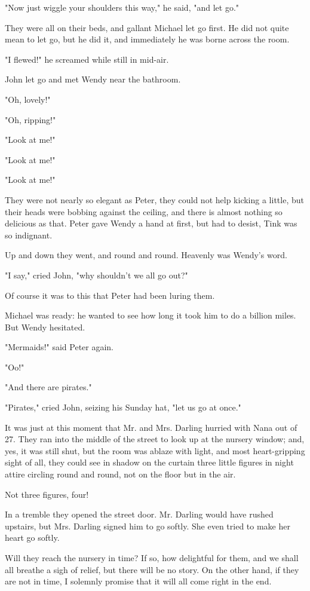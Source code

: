 "Now just wiggle your shoulders this way," he said, "and let go."


They were all on their beds, and gallant Michael let go first. He did not
quite mean to let go, but he did it, and immediately he was borne across
the room.


"I flewed!" he screamed while still in mid-air.


John let go and met Wendy near the bathroom.


"Oh, lovely!"


"Oh, ripping!"


"Look at me!"


"Look at me!"


"Look at me!"


They were not nearly so elegant as Peter, they could not help kicking a
little, but their heads were bobbing against the ceiling, and there is
almost nothing so delicious as that. Peter gave Wendy a hand at first, but
had to desist, Tink was so indignant.


Up and down they went, and round and round. Heavenly was Wendy's word.


"I say," cried John, "why shouldn't we all go out?"


Of course it was to this that Peter had been luring them.


Michael was ready: he wanted to see how long it took him to do a billion
miles. But Wendy hesitated.


"Mermaids!" said Peter again.


"Oo!"


"And there are pirates."


"Pirates," cried John, seizing his Sunday hat, "let us go at once."


It was just at this moment that Mr. and Mrs. Darling hurried with Nana out
of 27. They ran into the middle of the street to look up at the nursery
window; and, yes, it was still shut, but the room was ablaze with light,
and most heart-gripping sight of all, they could see in shadow on the
curtain three little figures in night attire circling round and round, not
on the floor but in the air.


Not three figures, four!


In a tremble they opened the street door. Mr. Darling would have rushed
upstairs, but Mrs. Darling signed him to go softly. She even tried to make
her heart go softly.


Will they reach the nursery in time? If so, how delightful for them, and
we shall all breathe a sigh of relief, but there will be no story. On the
other hand, if they are not in time, I solemnly promise that it will all
come right in the end.


